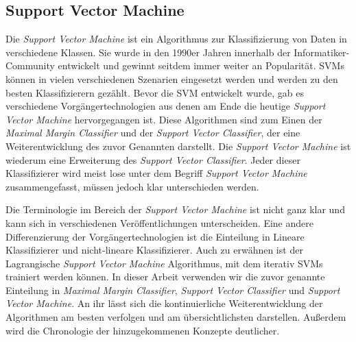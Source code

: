 \subsection{Support Vector Machine} \label{ssec:svm}
Die \textit{Support Vector Machine} ist ein Algorithmus zur Klassifizierung von Daten in verschiedene Klassen.
Sie wurde in den 1990er Jahren innerhalb der Informatiker-Community entwickelt und gewinnt seitdem immer weiter an Popularität.
\acp{SVM} können in vielen verschiedenen Szenarien eingesetzt werden und werden zu den besten Klassifizierern gezählt.
Bevor die SVM entwickelt wurde, gab es verschiedene Vorgängertechnologien aus denen am Ende die heutige \textit{Support Vector Machine} hervorgegangen ist. 
Diese Algorithmen sind zum Einen der \textit{Maximal Margin Classifier} und der \textit{Support Vector Classifier}, 
der eine Weiterentwicklung des zuvor Genannten darstellt.
Die \textit{Support Vector Machine} ist wiederum eine Erweiterung des \textit{Support Vector Classifier}.
Jeder dieser Klassifizierer wird meist lose unter dem Begriff \textit{Support Vector Machine} zusammengefasst,
müssen jedoch klar unterschieden werden.\cite[S. 337]{james_2013}

Die Terminologie im Bereich der \textit{Support Vector Machine} ist nicht ganz klar und kann sich in verschiedenen Veröffentlichungen unterscheiden.
Eine andere Differenzierung der Vorgängertechnologien ist die Einteilung in Lineare Klassifizierer und nicht-lineare Klassifizierer.
Auch zu erwähnen ist der Lagrangische \textit{Support Vector Machine} Algorithmus, mit dem iterativ SVMs trainiert werden können.\cite[S. 207]{suthaharan_2015}
In dieser Arbeit verwenden wir die zuvor genannte Einteilung in \textit{Maximal Margin Classifier}, \textit{Support Vector Classifier}
und \textit{Support Vector Machine}. An ihr lässt sich die kontinuierliche Weiterentwicklung der Algorithmen am besten verfolgen und am übersichtlichsten darstellen.
Außerdem wird die Chronologie der hinzugekommenen Konzepte deutlicher.

